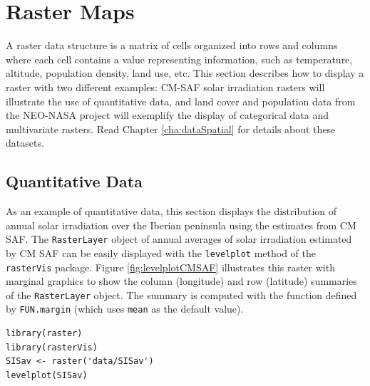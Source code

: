 
\section{Raster Maps}
\label{sec-1}
\label{cha:raster}

A raster data structure is a matrix of cells organized into rows and
columns where each cell contains a value representing information,
such as temperature, altitude, population density, land use, etc.
This section describes how to display a raster with two different
examples: CM-SAF solar irradiation rasters will illustrate the use of
quantitative data, and land cover and population data from the
NEO-NASA project will exemplify the display of categorical data and
multivariate rasters. Read Chapter \ref{cha:dataSpatial} for
details about these datasets.

\subsection{Quantitative Data}
\label{sec-1-1}
As an example of quantitative data, this section displays the
distribution of annual solar irradiation over the Iberian peninsula
using the estimates from CM SAF. The \texttt{RasterLayer} object of annual
averages of solar irradiation estimated by CM SAF can be easily
displayed with the \texttt{levelplot} method of the \texttt{rasterVis}
package. Figure \ref{fig:levelplotCMSAF} illustrates this raster with
marginal graphics to show the column (longitude) and row (latitude)
summaries of the \texttt{RasterLayer} object. The summary is computed with
the function defined by \texttt{FUN.margin} (which uses \texttt{mean} as the default
value).


\lstset{language=R,numbers=none}
\begin{lstlisting}
library(raster)
library(rasterVis)
SISav <- raster('data/SISav')
levelplot(SISav)
\end{lstlisting}

